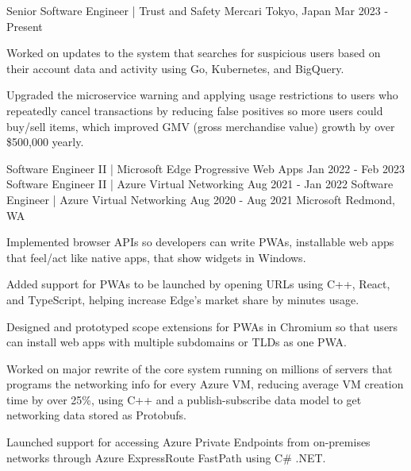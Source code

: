 

\begin{cventries}

    \cventry
    {Senior Software Engineer | Trust and Safety} %
    {Mercari} %
    {Tokyo, Japan} %
    {Mar 2023 - Present} %
    {
        \begin{cvitems} %
            \item {Worked on updates to the system that searches for suspicious users based on their account data and activity using Go, Kubernetes, and BigQuery.}
            \item {Upgraded the microservice warning and applying usage restrictions to users who repeatedly cancel transactions by reducing false positives so more users could buy/sell items, which improved GMV (gross merchandise value) growth by over \$500,000 yearly.}
        \end{cvitems}
    }

    \cventrythreepositions
    {Software Engineer II | Microsoft Edge Progressive Web Apps}
    {Jan 2022 - Feb 2023}
    {Software Engineer II | Azure Virtual Networking}
    {Aug 2021 - Jan 2022}
    {Software Engineer | Azure Virtual Networking}
    {Aug 2020 - Aug 2021}
    {Microsoft}
    {Redmond, WA}
    {
        \begin{cvitems} %
            \item {Implemented browser APIs so developers can write PWAs, installable web apps that feel/act like native apps, that show widgets in Windows.}
            \item {Added support for PWAs to be launched by opening URLs using C++, React, and TypeScript, helping increase Edge's market share by minutes usage.}
            \item {Designed and prototyped scope extensions for PWAs in Chromium so that users can install web apps with multiple subdomains or TLDs as one PWA.}
        \end{cvitems}
    }
    {
        \begin{cvitems} %
            \item {Worked on major rewrite of the core system running on millions of servers that programs the networking info for every Azure VM, reducing average VM creation time by over 25\%, using C++ and a publish-subscribe data model to get networking data stored as Protobufs.}
            \item {Launched support for accessing Azure Private Endpoints from on-premises networks through Azure ExpressRoute FastPath using C\# .NET.}
        \end{cvitems}
    }


\end{cventries}
